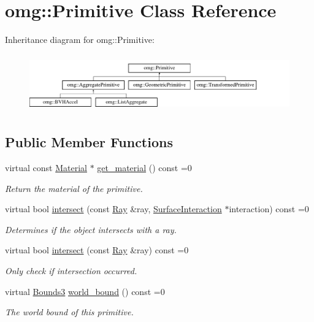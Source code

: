 \hypertarget{classomg_1_1_primitive}{}\section{omg\+::Primitive Class Reference}
\label{classomg_1_1_primitive}
Inheritance diagram for omg\+::Primitive\+:\begin{figure}[H]
\begin{center}
\leavevmode
\includegraphics[height=2.500000cm]{classomg_1_1_primitive}
\end{center}
\end{figure}
\subsection*{Public Member Functions}
\begin{DoxyCompactItemize}
\item 
virtual const \mbox{\hyperlink{classomg_1_1_material}{Material}} $\ast$ \mbox{\hyperlink{classomg_1_1_primitive_ad9cb98c6f74581d53cadf800fc506333}{get\+\_\+material}} () const =0
\begin{DoxyCompactList}\small\item\em Return the material of the primitive. \end{DoxyCompactList}\item 
virtual bool \mbox{\hyperlink{classomg_1_1_primitive_a51f78d3f52794ae02e18688dff75414c}{intersect}} (const \mbox{\hyperlink{classomg_1_1_ray}{Ray}} \&ray, \mbox{\hyperlink{classomg_1_1_surface_interaction}{Surface\+Interaction}} $\ast$interaction) const =0
\begin{DoxyCompactList}\small\item\em Determines if the object intersects with a ray. \end{DoxyCompactList}\item 
virtual bool \mbox{\hyperlink{classomg_1_1_primitive_a139c012a57ad2322c5bef078b5d7e653}{intersect}} (const \mbox{\hyperlink{classomg_1_1_ray}{Ray}} \&ray) const =0
\begin{DoxyCompactList}\small\item\em Only check if intersection occurred. \end{DoxyCompactList}\item 
virtual \mbox{\hyperlink{classomg_1_1_bounds3}{Bounds3}} \mbox{\hyperlink{classomg_1_1_primitive_a457b29547bc918cf8874b24f5168ff86}{world\+\_\+bound}} () const =0
\begin{DoxyCompactList}\small\item\em The world bound of this primitive. \end{DoxyCompactList}\end{DoxyCompactItemize}



